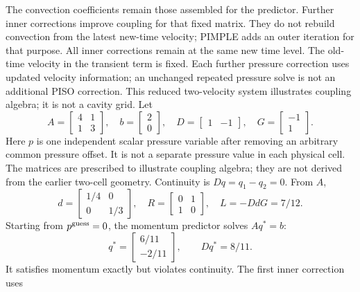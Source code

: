 The convection coefficients remain those assembled for the predictor.
Further inner corrections improve coupling for that fixed matrix. They do
not rebuild convection from the latest new-time velocity; PIMPLE adds an
outer iteration for that purpose.
\newpage
{}
All inner corrections remain at the same new time level. The old-time velocity in the transient term is fixed. Each further pressure correction uses updated velocity information; an unchanged repeated pressure solve is not an additional PISO correction.
\newpage
{}
This reduced two-velocity system illustrates coupling algebra; it is not a cavity grid. Let
\[
A=\begin{bmatrix}4&1\\1&3\end{bmatrix},\quad
b=\begin{bmatrix}2\\0\end{bmatrix},\quad
D=\begin{bmatrix}1&-1\end{bmatrix},\quad
G=\begin{bmatrix}-1\\1\end{bmatrix}.
\]
Here $p$ is one independent scalar pressure variable after removing an arbitrary common pressure offset. It is not a separate pressure value in each physical cell. The matrices are prescribed to illustrate coupling algebra; they are not derived from the earlier two-cell geometry. Continuity is $Dq=q_1-q_2=0$. From $A$,
\[
d=\begin{bmatrix}1/4&0\\0&1/3\end{bmatrix},\quad
R=\begin{bmatrix}0&1\\1&0\end{bmatrix},\quad L=-DdG=7/12.
\]
Starting from $p^{\rm guess}=0$, the momentum predictor solves $Aq^*=b$:
\[
q^*=\begin{bmatrix}6/11\\-2/11\end{bmatrix},\qquad Dq^*=8/11.
\]
It satisfies momentum exactly but violates continuity. The first inner correction uses

